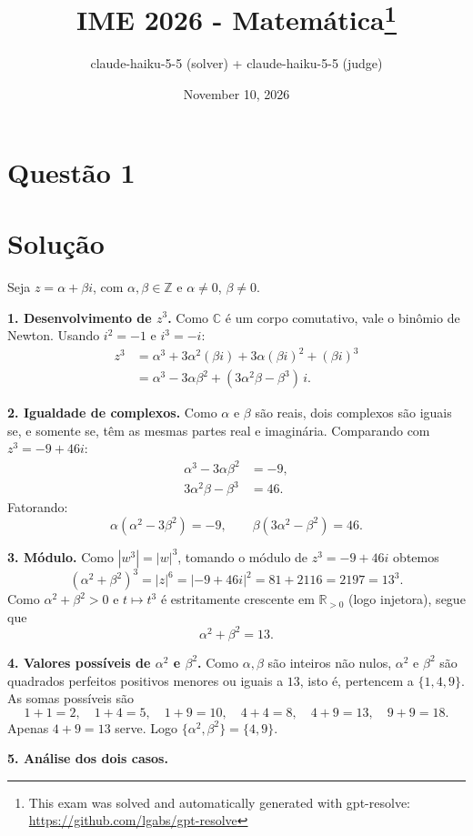 \documentclass{article}%
\title{IME 2026 - Matemática\thanks{This exam was solved and automatically generated with gpt-resolve: \url{https://github.com/lgabs/gpt-resolve}}}%
\author{claude{-}haiku{-}5{-}5 (solver) + claude{-}haiku{-}5{-}5 (judge)}%
\date{November 10, 2026}%
\begin{document}
%
\normalsize%
\maketitle%
\section*{Questão 1}

\section*{Solução}

Seja $z = \alpha + \beta i$, com $\alpha, \beta \in \mathbb{Z}$ e $\alpha \neq 0$, $\beta \neq 0$.

\textbf{1. Desenvolvimento de $z^3$.} Como $\mathbb{C}$ é um corpo comutativo, vale o binômio de Newton. Usando $i^2 = -1$ e $i^3 = -i$:
\begin{align*}
z^3 &= \alpha^3 + 3\alpha^2(\beta i) + 3\alpha(\beta i)^2 + (\beta i)^3 \\
    &= \alpha^3 - 3\alpha\beta^2 + (3\alpha^2\beta - \beta^3)\, i .
\end{align*}

\textbf{2. Igualdade de complexos.} Como $\alpha$ e $\beta$ são reais, dois complexos são iguais se, e somente se, têm as mesmas partes real e imaginária. Comparando com $z^3 = -9 + 46i$:
\begin{align*}
\alpha^3 - 3\alpha\beta^2 &= -9, \\
3\alpha^2\beta - \beta^3 &= 46 .
\end{align*}
Fatorando:
\[
\alpha(\alpha^2 - 3\beta^2) = -9, \qquad \beta(3\alpha^2 - \beta^2) = 46 .
\]

\textbf{3. Módulo.} Como $|w^3| = |w|^3$, tomando o módulo de $z^3 = -9 + 46i$ obtemos
\[
(\alpha^2 + \beta^2)^3 = |z|^6 = |-9 + 46i|^2 = 81 + 2116 = 2197 = 13^3 .
\]
Como $\alpha^2 + \beta^2 > 0$ e $t \mapsto t^3$ é estritamente crescente em $\mathbb{R}_{>0}$ (logo injetora), segue que
\[
\alpha^2 + \beta^2 = 13 .
\]

\textbf{4. Valores possíveis de $\alpha^2$ e $\beta^2$.} Como $\alpha, \beta$ são inteiros não nulos, $\alpha^2$ e $\beta^2$ são quadrados perfeitos positivos menores ou iguais a $13$, isto é, pertencem a $\{1, 4, 9\}$. As somas possíveis são
\[
1+1 = 2,\quad 1+4 = 5,\quad 1+9 = 10,\quad 4+4 = 8,\quad 4+9 = 13,\quad 9+9 = 18 .
\]
Apenas $4 + 9 = 13$ serve. Logo $\{\alpha^2, \beta^2\} = \{4, 9\}$.

\textbf{5. Análise dos dois casos.}
\end{document}

